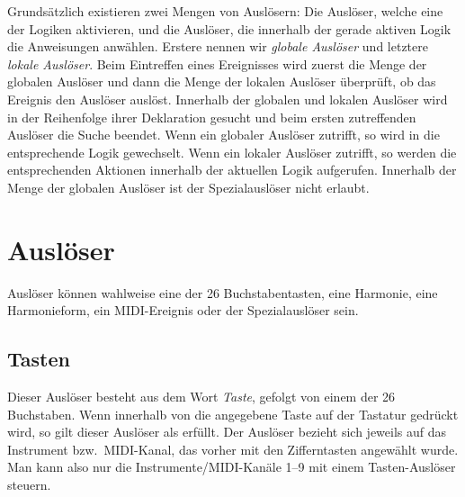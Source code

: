 Grundsätzlich existieren zwei Mengen von Auslösern: Die Auslöser, welche
eine der Logiken aktivieren, und die Auslöser, die innerhalb der
gerade aktiven Logik die Anweisungen anwählen. Erstere nennen wir
\emph{globale Auslöser}
 und letztere \emph{lokale Auslöser}. Beim Eintreffen
eines Ereignisses wird zuerst die Menge der globalen Auslöser
und dann die Menge der lokalen Auslöser überprüft, ob das Ereignis
den Auslöser auslöst. Innerhalb der globalen und lokalen Auslöser wird
in der Reihenfolge ihrer Deklaration gesucht und beim ersten zutreffenden
Auslöser die Suche beendet.
Wenn ein globaler Auslöser zutrifft, so wird in die entsprechende Logik
gewechselt. Wenn ein lokaler Auslöser zutrifft, so werden die entsprechenden
Aktionen innerhalb der aktuellen Logik aufgerufen.
Innerhalb der Menge der globalen Auslöser ist der Spezialauslöser
 nicht erlaubt.





\section{Auslöser}\label{sec:ausloser}

Auslöser können wahlweise eine der 26 Buchstabentasten, eine Harmonie,
eine Harmonieform,
ein MIDI-Ereignis oder der Spezialauslöser  sein.



\subsection{Tasten}\label{sec:tasten}

Dieser Auslöser
 besteht aus dem Wort \emph{Taste}, gefolgt von einem der
26 Buchstaben. Wenn innerhalb von \mutabor{} die angegebene Taste auf der
Tastatur gedrückt wird, so gilt dieser Auslöser als erfüllt.
Der Auslöser bezieht sich jeweils auf das Instrument bzw.\ MIDI-Kanal,
das vorher
mit den Zifferntasten angewählt wurde. Man kann also nur die
Instrumente/MIDI-Kanäle 1--9 mit einem Tasten-Auslöser steuern.

      


